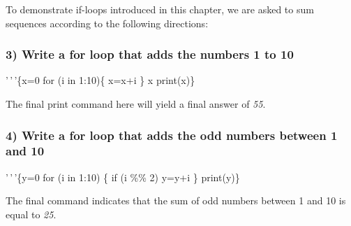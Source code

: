 \documentclass[
]{article}
\begin{document}
To demonstrate if-loops introduced in this chapter, we are asked to sum
sequences according to the following directions:

\hypertarget{write-a-for-loop-that-adds-the-numbers-1-to-10}{%
\subsubsection{3) Write a for loop that adds the numbers 1 to
10}\label{write-a-for-loop-that-adds-the-numbers-1-to-10}}

'\,'\,'\{x=0 for (i in 1:10)\{ x=x+i \} x print(x)\}

The final print command here will yield a final answer of \emph{55}.

\hypertarget{write-a-for-loop-that-adds-the-odd-numbers-between-1-and-10}{%
\subsubsection{4) Write a for loop that adds the odd numbers between 1
and
10}\label{write-a-for-loop-that-adds-the-odd-numbers-between-1-and-10}}

'\,'\,'\{y=0 for (i in 1:10) \{ if (i \%\% 2) y=y+i \} print(y)\}

The final command indicates that the sum of odd numbers between 1 and 10
is equal to \emph{25}.
\end{document}
